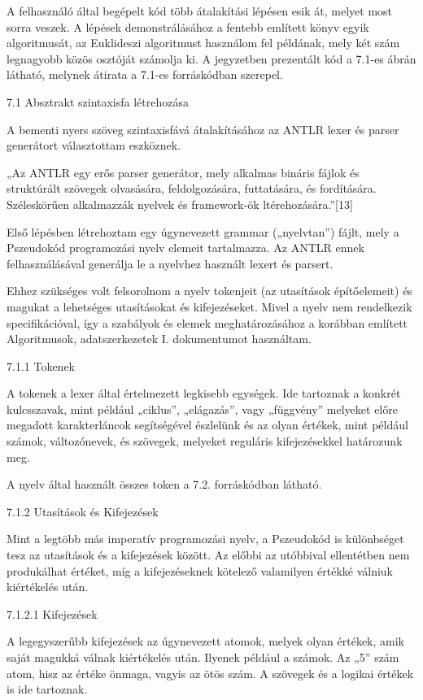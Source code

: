 A felhasználó által begépelt kód több átalakítási lépésen esik át, melyet most sorra veszek. A lépések demonstrálásához a fentebb említett könyv egyik algoritmusát, az Euklideszi algoritmust használom fel példának, mely két szám legnagyobb közös osztóját számolja ki. A jegyzetben prezentált kód a 7.1-es ábrán látható, melynek átirata a 7.1-es forráskódban szerepel.

7.1 Absztrakt szintaxisfa létrehozása

A bementi nyers szöveg szintaxisfává átalakításához az ANTLR lexer és parser generátort választottam eszköznek.

„Az ANTLR egy erős parser generátor, mely alkalmas bináris fájlok és struktúrált szövegek olvasására, feldolgozására, futtatására, és fordítására. Széleskörűen alkalmazzák nyelvek és framework-ök ltérehozására.”[13]

Első lépésben létrehoztam egy úgynevezett grammar („nyelvtan”) fájlt, mely a Pszeudokód programozási nyelv elemeit tartalmazza. Az ANTLR ennek felhasználásával generálja le a nyelvhez használt lexert és parsert.

Ehhez szükséges volt felsorolnom a nyelv tokenjeit (az utasítások építőelemeit) és magukat a lehetséges utasításokat és kifejezéseket. Mivel a nyelv nem rendelkezik specifikációval, így a szabályok és elemek meghatározásához a korábban említett Algoritmusok, adatszerkezetek I. dokumentumot használtam.

7.1.1 Tokenek

A tokenek a lexer által értelmezett legkisebb egységek. Ide tartoznak a konkrét kulcsszavak, mint például „ciklus”, „elágazás”, vagy „függvény” melyeket előre megadott karakterláncok segítségével észlelünk és az olyan értékek, mint például számok, változónevek, és szövegek, melyeket reguláris kifejezésekkel határozunk meg.

A nyelv által használt összes token a 7.2. forráskódban látható.

7.1.2 Utasítások és Kifejezések

Mint a legtöbb más imperatív programozási nyelv, a Pszeudokód is különbséget tesz az utasítások és a kifejezések között. Az előbbi az utóbbival ellentétben nem produkálhat értéket, míg a kifejezéseknek kötelező valamilyen értékké válniuk kiértékelés után.

7.1.2.1 Kifejezések

A legegyszerűbb kifejezések az úgynevezett atomok, melyek olyan értékek, amik saját magukká válnak kiértékelés után. Ilyenek például a számok. Az „5” szám atom, hisz az értéke önmaga, vagyis az ötös szám. A szövegek és a logikai értékek is ide tartoznak.

